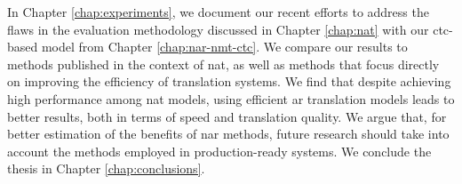 In Chapter \ref{chap:experiments}, we document our recent efforts to address
the flaws in the evaluation methodology discussed in Chapter \ref{chap:nat}
with our \acs{ctc}-based model from Chapter \ref{chap:nar-nmt-ctc}. We compare
our results to methods published in the context of \ac{nat}, as well as methods
that focus directly on improving the efficiency of translation systems.  We
find that despite achieving high performance among \ac{nat} models, using
efficient \acl{ar} translation models leads to better results, both in terms of
speed and translation quality. We argue that, for better estimation of the
benefits of \acl{nar} methods, future research should take into account the
methods employed in production-ready systems.
%
We conclude the thesis in Chapter \ref{chap:conclusions}.

